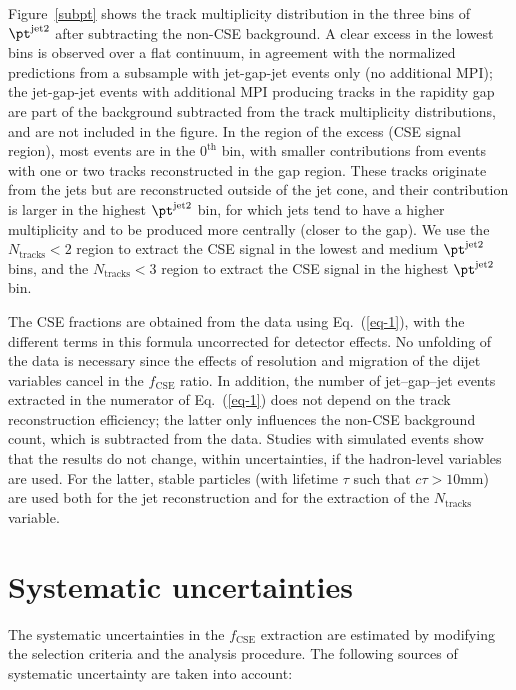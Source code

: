 \documentclass[11pt,twoside,a4paper,cmspaper,final,collab]{cms-tdr}
\begin{document}
Figure~\ref{subpt} shows the track multiplicity distribution in the three bins of $\pt^\text{jet2}$ after subtracting the non-CSE background. A clear excess in the lowest bins is observed over a flat continuum, in agreement with the normalized predictions from a  subsample with jet-gap-jet events only (no additional MPI); the jet-gap-jet events with additional MPI producing tracks in the rapidity gap are part of the background subtracted from the track multiplicity distributions, and are not included in the figure. In the region of the excess (CSE signal region), most events are in the $0^\text{th}$ bin, with smaller contributions from events with one or two tracks reconstructed in the gap region. These tracks originate from the jets but are reconstructed outside of the jet cone, and their contribution is larger in the highest $\pt^\text{jet2}$ bin, for which jets tend to have a higher multiplicity and to be produced more centrally (closer to the gap). We use the $N_\text{tracks}<2$ region to extract the CSE signal in the lowest and medium $\pt^\text{jet2}$ bins, and the $N_\text{tracks}<3$ region to extract the CSE signal in the highest $\pt^\text{jet2}$ bin.


The CSE fractions are obtained from the data using Eq.~(\ref{eq-1}), with the different terms in this formula uncorrected for detector effects. No unfolding of the data is necessary since the effects of resolution and migration of the dijet variables cancel in the $f_\mathrm{CSE}$ ratio. In addition, the number of jet--gap--jet events extracted in the numerator of Eq.~(\ref{eq-1}) does not depend on the track reconstruction efficiency; the latter only influences the non-CSE background count, which is subtracted from the data. Studies with simulated events show that the results do not change, within uncertainties, if the hadron-level variables are used. For the latter, stable particles (with lifetime $\tau$ such that $c\tau > 10$\unit{mm}) are used both for the jet reconstruction and for the extraction of the $N_\text{tracks}$ variable.

\section{Systematic uncertainties}
\label{sec-syst}

The systematic uncertainties in the $f_\mathrm{CSE}$ extraction are estimated by modifying the selection criteria and the analysis procedure. The following sources of systematic uncertainty are taken into account:
\end{document}

